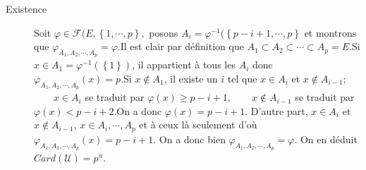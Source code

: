 \begin{enumerate}
\begin{description}
\item[Existence]  Soit $\varphi \in \mathcal{F}(E,\left\{ 1,\cdots
,p\right\} ,$ posons $A_{i}=\varphi ^{-1}(\left\{ p-i+1,\cdots
,p\right\} $ et montrons que $\varphi _{A_{1},A_{2},\cdots
,A_{p}}=\varphi $.\newline Il est clair par d{\'e}finition que
$A_{1}\subset A_{2}\subset \cdots \subset A_{p}=E$.\newline Si
$x\in A_{1}=\varphi ^{-1}(\left\{ 1\right\} )$, il appartient {\`a}
tous les $A_{i}$ donc $\varphi _{A_{1},A_{2},\cdots
,A_{p}}(x)=p$.\newline Si $x\notin A_{1}$, il existe un $i$ tel
que $x\in A_{i}$ et $x\notin A_{i-1} $; \newline $\qquad x\in
A_{i}$ se traduit par $\varphi (x)\geq p-i+1,$\newline $\qquad
x\notin A_{i-1}$ se traduit par $\varphi (x)<p-i+2.$\newline On a
donc $\varphi (x)=p-i+1$. D'autre part, $x\in A_{i}$ et $x\notin
A_{i-1} $, $x\in A_{i},\cdots ,A_{p}$ et {\`a} ceux l{\`a} seulement
d'o{\`u} $\varphi _{A_{1},A_{2},\cdots ,A_{p}}(x)=p-i+1$. On a donc bien $%
\varphi _{A_{1},A_{2},\cdots ,A_{p}}=\varphi $. On en d{\'e}duit $Card(%
\mathcal{U})=p^{n}$.
\end{description}

\end{enumerate}
